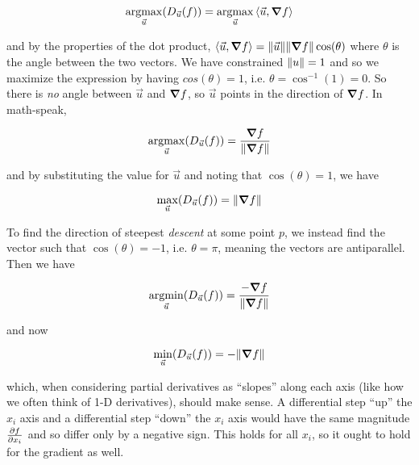 \documentclass[letterpaper,12pt]{report}
\DeclareMathOperator*{\argmax}{argmax}
\DeclareMathOperator*{\argmin}{argmin}
\begin{document}
\[
  \argmax_{\vec{u}}(D_{\vec{u}}(f)) 
  = \argmax_{\vec{u}}\innerprod{\vec{u}}{\grad{f}}
\]

and by the properties of the dot product,
\(\left<\vec{u},\grad{f}\right> = 
\norm{\vec{u}}\norm{\grad{f}}\cos(\theta)\) where
\(\theta\) is the angle between the two vectors.
We have constrained \(\norm{u} = 1\) and so we
maximize the expression by having \(cos(\theta) = 1\), 
i.e. \(\theta = \cos^{-1}(1) = 0\).
So there is \emph{no} angle between \(\vec{u}\)
and \(\grad{f}\), so \(\vec{u}\) points in the direction
of \(\grad{f}\). In math-speak,

\[
  \argmax_{\vec{u}}(D_{\vec{u}}(f)) 
  = \frac{\grad{f}}{\norm{\grad{f}}}
\]

and by substituting the value for \(\vec{u}\)
and noting that \(\cos(\theta) = 1\), we have

\[
  \max_{\vec{u}}(D_{\vec{u}}(f)) 
  = \norm{\grad{f}}
\]

To find the direction of steepest \emph{descent} at 
some point \(p\),
we instead find the vector such that \(\cos(\theta) = -1\),
i.e. \(\theta = \pi\), meaning the vectors are antiparallel.
Then we have

\[
  \argmin_{\vec{u}}(D_{\vec{u}}(f)) 
  = \frac{-\grad{f}}{\norm{\grad{f}}}
\]

and now

\[
  \min_{\vec{u}}(D_{\vec{u}}(f)) 
  = -\norm{\grad{f}}
\]

which, when considering partial derivatives as ``slopes''
along each axis (like how we often think of 1-D derivatives),
should make sense.
A differential step ``up'' the \(x_i\) axis 
and a differential step ``down'' the \(x_i\) axis
would have the same magnitude \(\pdv{f}{x_i}\) and so differ
only by a negative sign.
This holds for all \(x_i\), so it ought to hold
for the gradient as well.

\end{document}
